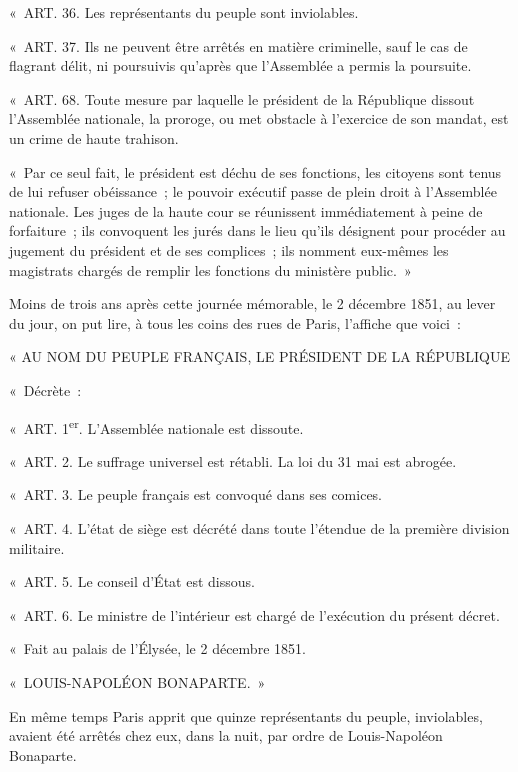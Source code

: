 \documentclass[french,twoside]{book} %
\newenvironment{quoteblock}%
  {\begin{quoting}}
  {\end{quoting}}
\newenvironment{quotebar}{%
    \def\FrameCommand{{\color{rubric!10!}\vrule width 0.5em} \hspace{0.9em}}%
    \def\OuterFrameSep{0pt} %
    \MakeFramed {\advance\hsize-\width \FrameRestore}
  }%
  {%
    \endMakeFramed
  }
\renewenvironment{quoteblock}%
  {%
    \savenotes
    \setstretch{0.9}
    \begin{quotebar}
    \smallskip
  }
  {%
    \smallskip
    \end{quotebar}
    \spewnotes
  }
\begin{document}
\begin{quoteblock}
 \noindent « ART. 36. Les représentants du peuple sont inviolables.\par
 « ART. 37. Ils ne peuvent être arrêtés en matière criminelle, sauf le cas de flagrant délit, ni poursuivis qu’après que l’Assemblée a permis la poursuite.\par
 « ART. 68. Toute mesure par laquelle le président de la République dissout l’Assemblée nationale, la proroge, ou met obstacle à l’exercice de son mandat, est un crime de haute trahison.\par
 « Par ce seul fait, le président est déchu de ses fonctions, les citoyens sont tenus de lui refuser obéissance ; le pouvoir exécutif passe de plein droit à l’Assemblée nationale. Les juges de la haute cour se réunissent immédiatement à peine de forfaiture ; ils convoquent les jurés dans le lieu qu’ils désignent pour procéder au jugement du président et de ses complices ; ils nomment eux-mêmes les magistrats chargés de remplir les fonctions du ministère public. »
 \end{quoteblock}

\noindent Moins de trois ans après cette journée mémorable, le 2 décembre 1851, au lever du jour, on put lire, à tous les coins des rues de Paris, l’affiche que voici :\par

\begin{quoteblock}
 \noindent « AU NOM DU PEUPLE FRANÇAIS, LE PRÉSIDENT DE LA RÉPUBLIQUE\par
 « Décrète :\par
 « ART. 1\textsuperscript{er}. L’Assemblée nationale est dissoute.\par
 « ART. 2. Le suffrage universel est rétabli. La loi du 31 mai est abrogée.\par
 « ART. 3. Le peuple français est convoqué dans ses comices.\par
 « ART. 4. L’état de siège est décrété dans toute l’étendue de la première division militaire.\par
 « ART. 5. Le conseil d’État est dissous.\par
 « ART. 6. Le ministre de l’intérieur est chargé de l’exécution du présent décret.\par
 « Fait au palais de l’Élysée, le 2 décembre 1851.\par
 « LOUIS-NAPOLÉON BONAPARTE. »
 \end{quoteblock}

\noindent En même temps Paris apprit que quinze représentants du peuple, inviolables, avaient été arrêtés chez eux, dans la nuit, par ordre de Louis-Napoléon Bonaparte.
\end{document}
